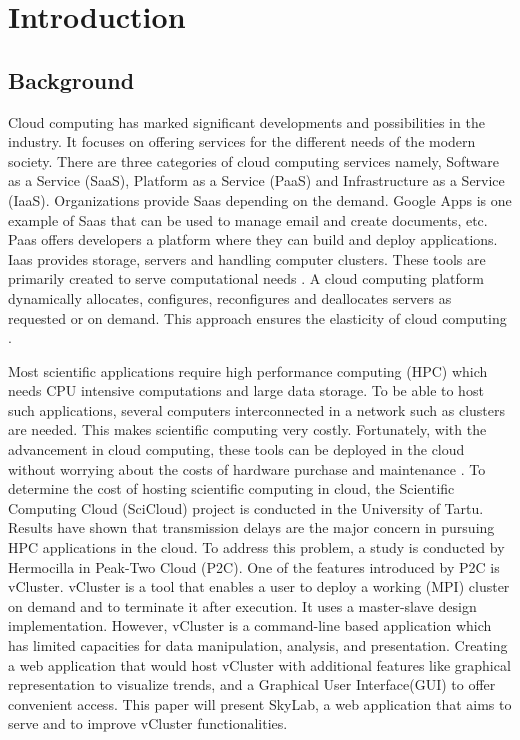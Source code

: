 
\section{Introduction}
	\subsection{Background}
	Cloud computing has marked significant developments and possibilities in the industry. It focuses on offering services for the different needs of the modern society.
	 There are three categories of cloud computing services namely, Software as a Service (SaaS), Platform as a Service (PaaS) and Infrastructure as a Service (IaaS). Organizations provide Saas depending on the demand. Google Apps is one example of Saas that can be used to manage email and create documents, etc. Paas offers developers a platform where they can build and deploy applications. Iaas provides storage, servers and handling computer clusters. These tools are primarily created to serve computational needs \cite {Ahuja2012}. A cloud computing platform dynamically allocates, configures, reconfigures and deallocates servers as requested or on demand. This approach ensures the elasticity of cloud computing \cite {Brandic2011}.

	Most scientific applications require high performance computing (HPC) which needs CPU intensive computations and large data storage. To be able to host such applications, several computers interconnected in a network such as clusters are needed. This makes scientific computing very costly. Fortunately, with the advancement in cloud computing, these tools can be deployed in the cloud without worrying about the costs of hardware purchase and maintenance \cite {Ahuja2012}. To determine the cost of hosting scientific computing in cloud, the Scientific Computing Cloud (SciCloud) project is conducted in the University of Tartu. Results have shown that transmission delays are the major concern in pursuing HPC applications in the cloud\cite {Brandic2011}.  To address this problem, a study is conducted by Hermocilla\cite {Hermocilla2014} in Peak-Two Cloud (P2C). One of the features introduced by P2C is vCluster. vCluster is a tool that enables a user to deploy a working (MPI) cluster on demand and to terminate it after execution. It uses a master-slave design implementation. However, vCluster is a command-line based application which has limited capacities for data manipulation, analysis, and presentation. Creating a web application that would host vCluster with additional features like graphical representation to visualize trends, and a Graphical User Interface(GUI) to offer convenient access. This paper will present SkyLab, a web application that aims to serve and to improve vCluster functionalities.

